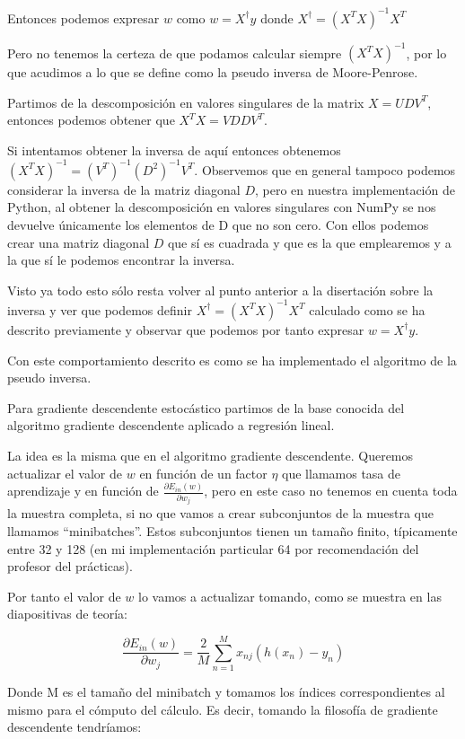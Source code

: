 \documentclass[12pt,a4paper]{article}
\begin{document}
Entonces podemos expresar $w$ como $w = X^{\dagger}y$ donde $X^{\dagger} = (X^T X)^{-1}X^T$

Pero no tenemos la certeza de que podamos calcular siempre $(X^T X)^{-1}$, por lo que acudimos a lo que se define como la pseudo inversa de Moore-Penrose.

Partimos de la descomposición en valores singulares de la matrix $X = UDV^T$, entonces podemos obtener que $X^TX = VDDV^T$.

Si intentamos obtener la inversa de aquí entonces obtenemos $(X^TX)^{-1} = (V^T)^{-1}(D^2)^{-1}V^T$. Observemos que en general tampoco podemos considerar la inversa de la matriz diagonal $D$, pero en nuestra implementación de Python, al obtener la descomposición en valores singulares con NumPy se nos devuelve únicamente los elementos de D que no son cero. Con ellos podemos crear una matriz diagonal $D$ que sí es cuadrada y que es la que emplearemos y a la que sí le podemos encontrar la inversa.

Visto ya todo esto sólo resta volver al punto anterior a la disertación sobre la inversa y ver que podemos definir $X^{\dagger} = (X^T X)^{-1}X^T$ calculado como se ha descrito previamente y observar que podemos por tanto expresar $w = X^{\dagger}y$.

Con este comportamiento descrito es como se ha implementado el algoritmo de la pseudo inversa.

Para gradiente descendente estocástico partimos de la base conocida del algoritmo gradiente descendente aplicado a regresión lineal.

La idea es la misma que en el algoritmo gradiente descendente. Queremos actualizar el valor de $w$ en función de un factor $\eta$ que llamamos tasa de aprendizaje y en función de $\frac{\partial E_{in}(w)}{\partial w_j}$, pero en este caso no tenemos en cuenta toda la muestra completa, si no que vamos a crear subconjuntos de la muestra que llamamos ``minibatches''. Estos subconjuntos tienen un tamaño finito, típicamente entre 32 y 128 (en mi implementación particular 64 por recomendación del profesor del prácticas).

Por tanto el valor de $w$ lo vamos a actualizar tomando, como se muestra en las diapositivas de teoría:

$$\frac{\partial E_{in}(w)}{\partial w_j} = \frac{2}{M}\sum_{n=1}^{M}x_{nj}(h(x_n)-y_n)$$

Donde M es el tamaño del minibatch y tomamos los índices correspondientes al mismo para el cómputo del cálculo. Es decir, tomando la filosofía de gradiente descendente tendríamos:
\end{document}
